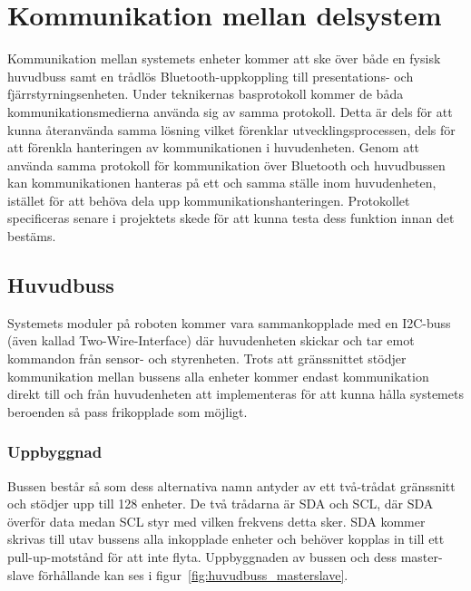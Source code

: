 \documentclass{article}
\begin{document}
\section{Kommunikation mellan delsystem}
Kommunikation mellan systemets enheter kommer att ske över både en fysisk huvudbuss samt en trådlös Bluetooth-uppkoppling till presentations- och fjärrstyrningsenheten. Under teknikernas basprotokoll kommer de båda kommunikationsmedierna använda sig av samma protokoll. Detta är dels för att kunna återanvända samma lösning vilket förenklar utvecklingsprocessen, dels för att förenkla hanteringen av kommunikationen i huvudenheten. Genom att använda samma protokoll för kommunikation över Bluetooth och huvudbussen kan kommunikationen hanteras på ett och samma ställe inom huvudenheten, istället för att behöva dela upp kommunikationshanteringen. Protokollet specificeras senare i projektets skede för att kunna testa dess funktion innan det bestäms.


\subsection{Huvudbuss}
Systemets moduler på roboten kommer vara sammankopplade med en I2C-buss (även kallad Two-Wire-Interface) där huvudenheten skickar och tar emot kommandon från sensor- och styrenheten. Trots att gränssnittet stödjer kommunikation mellan bussens alla enheter kommer endast kommunikation direkt till och från huvudenheten att implementeras för att kunna hålla systemets beroenden så pass frikopplade som möjligt.

\subsubsection{Uppbyggnad}
Bussen består så som dess alternativa namn antyder av ett två-trådat gränssnitt och stödjer upp till 128 enheter. De två trådarna är SDA och SCL, där SDA överför data medan SCL styr med vilken frekvens detta sker. SDA kommer skrivas till utav bussens alla inkopplade enheter och behöver kopplas in till ett pull-up-motstånd för att inte flyta. Uppbyggnaden av bussen och dess master-slave förhållande kan ses i figur~\ref{fig:huvudbuss_masterslave}.
\end{document}
